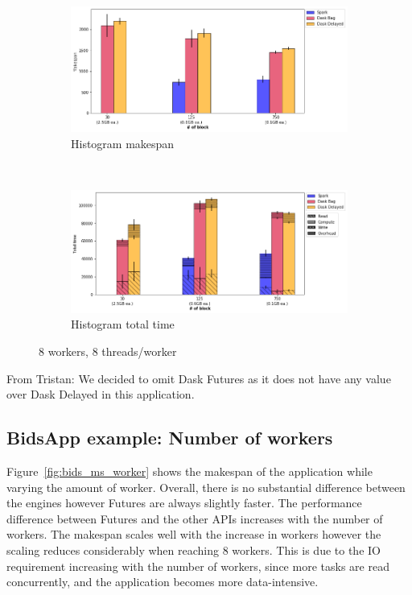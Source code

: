 \documentclass[conference]{IEEEtran}
\newcommand{\TG}[1]{\color{cyan}From Tristan: #1 \color{black}}
\begin{document}
\begin{figure}[!t]
    \centering
    \begin{subfigure}[b]{\columnwidth}
        \includegraphics[clip,width=\columnwidth]{images/histo_block.png}%
        \caption{Histogram makespan}\label{fig:histo_ms_block}
    \end{subfigure}
    \\
    \begin{subfigure}[b]{\columnwidth}
        \includegraphics[clip,width=\columnwidth]{images/histo_idle_block.png}%
        \caption{Histogram total time}\label{fig:histo_tt_block}
    \end{subfigure}
    \caption{8 workers, 8 threads/worker}
\end{figure}
\TG{We decided to omit Dask Futures as it does not have any value over Dask
Delayed in this application.}


\subsection{BidsApp example: Number of workers}
Figure~\ref{fig:bids_ms_worker} shows the makespan of the application while varying
the amount of worker. Overall, there is no substantial difference between the
engines however Futures are always slightly faster. The performance difference between
Futures and the other APIs increases with the number of workers. The makespan scales
well with the increase in workers however the scaling reduces considerably when
reaching 8 workers. This is due to the IO requirement increasing with the number of
workers, since more tasks are read concurrently, and the application becomes more
data-intensive.
\end{document}

